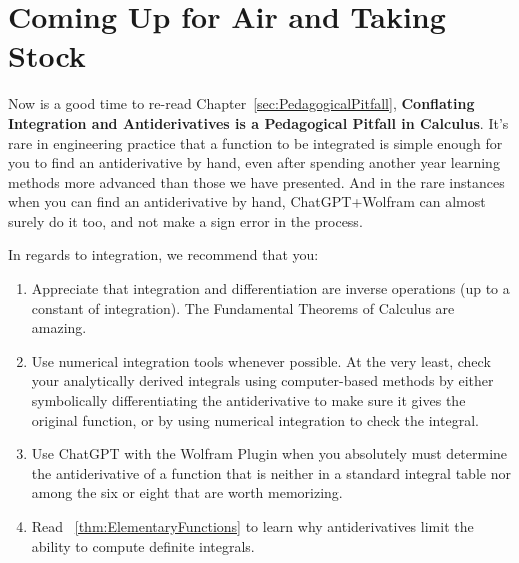 

\section{Coming Up for Air and Taking Stock}

Now is a good time to re-read Chapter~\ref{sec:PedagogicalPitfall}, \textbf{Conflating Integration and Antiderivatives is a Pedagogical Pitfall in Calculus}. It's rare in engineering practice that a function to be integrated is simple enough for you to find an antiderivative by hand, even after spending another year learning methods more advanced than those we have presented. And in the rare instances when you can find an antiderivative by hand, ChatGPT+Wolfram can almost surely do it too, and not make a sign error in the process. 

In regards to integration, we recommend that you:
\begin{enumerate}
    \item Appreciate that integration and differentiation are inverse operations (up to a constant of integration). The Fundamental Theorems of Calculus are amazing. 
    \item Use numerical integration tools whenever possible. At the very least, check your analytically derived integrals using computer-based methods by either symbolically differentiating the antiderivative to make sure it gives the original function, or by using numerical integration to check the integral. 
    \item Use ChatGPT with the Wolfram Plugin when you absolutely must determine the antiderivative of a function that is neither in a standard integral table nor among the six or eight that are worth memorizing.
    \item Read ~\ref{thm:ElementaryFunctions} to learn why antiderivatives limit the ability to compute definite integrals.
\end{enumerate}

